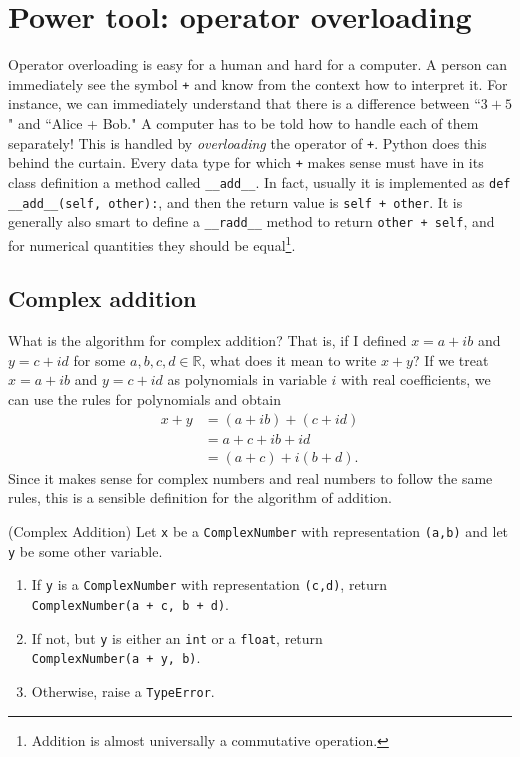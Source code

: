 \documentclass[m3380-lec-main.tex]{subfiles}
\begin{document}
\section{Power tool: operator overloading}
Operator overloading is easy for a human and hard for a computer. A person can immediately see the symbol \verb|+| and know from the context how to interpret it. For instance, we can immediately understand that there is a difference between ``$3+5$" and ``Alice + Bob." A computer has to be told how to handle each of them separately! This is handled by \emph{overloading} the operator of \verb|+|. Python does this behind the curtain. Every data type for which \verb|+| makes sense must have in its class definition a method called \verb|__add__|. In fact, usually it is implemented as \verb|def __add__(self, other):|, and then the return value is \verb|self + other|. It is generally also smart to define a \verb|__radd__| method to return \verb|other + self|, and for numerical quantities they should be equal\footnote{Addition is almost universally a commutative operation.}. 

\subsection{Complex addition} What is the algorithm for complex addition? That is, if I defined $x=a+ib$ and $y=c+id$ for some $a,b,c,d\in\mathbb{R}$, what does it mean to write $x+y$? If we treat $x=a+ib$ and $y=c+id$ as polynomials in variable $i$ with real coefficients, we can use the rules for polynomials and obtain
\begin{align*}
x + y & = (a+ib) + (c+id) \\
	&= a+c+ib+id \\
	&=(a+c) + i(b+d).
\end{align*}
Since it makes sense for complex numbers and real numbers to follow the same rules, this is a sensible definition for the algorithm of addition.
\begin{alg}(Complex Addition)
Let \verb|x| be a \verb|ComplexNumber| with representation \verb|(a,b)| and let \verb|y| be some other variable.
\begin{enumerate}\setlength{\itemsep}{0pt}
\item If \verb|y| is a \verb|ComplexNumber| with representation \verb|(c,d)|, return \\ \verb|ComplexNumber(a + c, b + d)|.
\item If not, but \verb|y| is either an \verb|int| or a \verb|float|, return \\ \verb|ComplexNumber(a + y, b)|.
\item Otherwise, raise a \verb|TypeError|.
\end{enumerate}
\end{alg}
\end{document}
